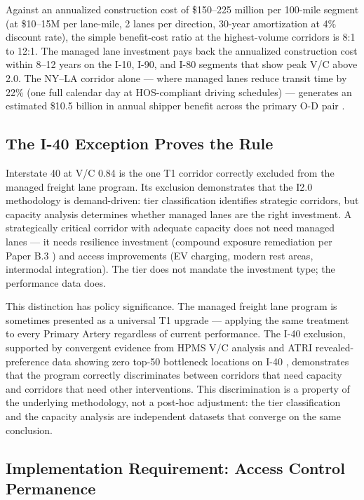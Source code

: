 Against an annualized construction cost of \$150--225 million per 100-mile segment (at \$10--15M per lane-mile, 2 lanes per direction, 30-year amortization at 4\% discount rate), the simple benefit-cost ratio at the highest-volume corridors is 8:1 to 12:1. The managed lane investment pays back the annualized construction cost within 8--12 years on the I-10, I-90, and I-80 segments that show peak V/C above 2.0. The NY--LA corridor alone --- where managed lanes reduce transit time by 22\% (one full calendar day at HOS-compliant driving schedules) --- generates an estimated \$10.5 billion in annual shipper benefit across the primary O-D pair \citep{FMCSA_HOS2024}.

\subsection*{The I-40 Exception Proves the Rule}

Interstate 40 at V/C 0.84 is the one T1 corridor correctly excluded from the managed freight lane program. Its exclusion demonstrates that the I2.0 methodology is demand-driven: tier classification identifies strategic corridors, but capacity analysis determines whether managed lanes are the right investment. A strategically critical corridor with adequate capacity does not need managed lanes --- it needs resilience investment (compound exposure remediation per Paper B.3 \citep{ROUTE_B3}) and access improvements (EV charging, modern rest areas, intermodal integration). The tier does not mandate the investment type; the performance data does.

This distinction has policy significance. The managed freight lane program is sometimes presented as a universal T1 upgrade --- applying the same treatment to every Primary Artery regardless of current performance. The I-40 exclusion, supported by convergent evidence from HPMS V/C analysis and ATRI revealed-preference data showing zero top-50 bottleneck locations on I-40 \citep{ROUTE_B2}, demonstrates that the program correctly discriminates between corridors that need capacity and corridors that need other interventions. This discrimination is a property of the underlying methodology, not a post-hoc adjustment: the tier classification and the capacity analysis are independent datasets that converge on the same conclusion.

\subsection*{Implementation Requirement: Access Control Permanence}

